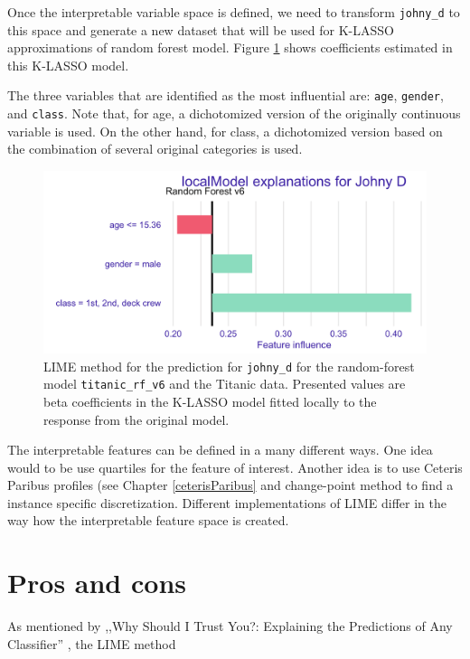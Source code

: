 \documentclass[]{krantz}
\begin{document}
Once the interpretable variable space is defined, we need to transform \texttt{johny\_d} to this space and generate a new dataset that will be used for K-LASSO approximations of random forest model. Figure \ref{fig:LIMEexample01} shows coefficients estimated in this K-LASSO model.

The three variables that are identified as the most influential are: \texttt{age}, \texttt{gender}, and \texttt{class}. Note that, for age, a dichotomized version of the originally continuous variable is used. On the other hand, for class, a dichotomized version based on the combination of several original categories is used.



\begin{figure}

{\centering \includegraphics[width=0.6\linewidth]{figure/LIMEexample01} 

}

\caption{LIME method for the prediction for \texttt{johny\_d} for the random-forest model \texttt{titanic\_rf\_v6} and the Titanic data. Presented values are beta coefficients in the K-LASSO model fitted locally to the response from the original model.}\label{fig:LIMEexample01}
\end{figure}

The interpretable features can be defined in a many different ways. One idea would to be use quartiles for the feature of interest. Another idea is to use Ceteris Paribus profiles (see Chapter \ref{ceterisParibus} and change-point method \citep{picard_1985} to find a instance specific discretization.
Different implementations of LIME differ in the way how the interpretable feature space is created.

\hypertarget{LIMEProsCons}{%
\section{Pros and cons}\label{LIMEProsCons}}

As mentioned by ,,Why Should I Trust You?: Explaining the Predictions of Any Classifier'' \citep{lime}, the LIME method
\end{document}
